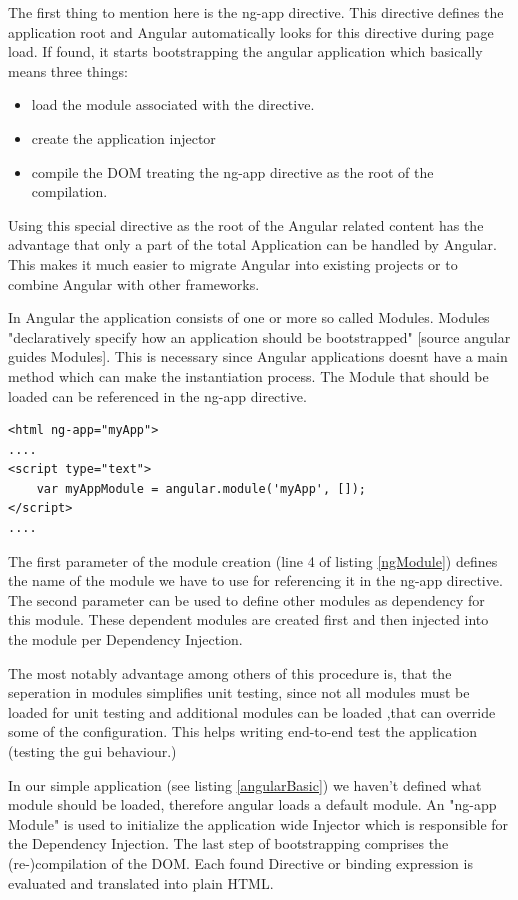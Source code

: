 The first thing to mention here is the ng-app directive. This directive defines the application root and Angular automatically looks for this directive during page load. If found, it starts bootstrapping the angular application which basically means three things:
\begin{itemize}
	\item load the module associated with the directive.
	\item create the application injector
	\item compile the DOM treating the ng-app directive as the root of the compilation. 
\end{itemize}

Using this special directive as the root of the Angular related content has the advantage that only a part of the total Application can be handled by Angular. This makes it much easier to migrate Angular into existing projects or to combine Angular with other frameworks.

In Angular the application consists of one or more so called Modules. Modules "declaratively specify how an application should be bootstrapped" [source angular guides Modules]. This is necessary since Angular applications doesnt have a main method which can make the instantiation process. The Module that should be loaded can be referenced in the ng-app directive. 
\begin{lstlisting}[label=ngModule]
<html ng-app="myApp">
....
<script type="text">
	var myAppModule = angular.module('myApp', []);
</script>
....
\end{lstlisting}

The first parameter of the module creation (line 4 of listing \ref{ngModule}) defines the name of the module we have to use for referencing it in the ng-app directive. The second parameter can be used to define other modules as dependency for this module. These dependent modules are created first and then injected into the module per Dependency Injection.


The most notably advantage among others of this procedure is, that the seperation in modules simplifies unit testing, since not all modules must be loaded for unit testing and additional modules can be loaded ,that can override some of the configuration. This helps writing end-to-end test the application (testing the gui behaviour.) 


In our simple application (see listing \ref{angularBasic}) we haven't defined what module should be loaded, therefore angular loads a default module. An "ng-app Module" is used to initialize the application wide Injector which is responsible for the Dependency Injection. The last step of bootstrapping comprises the (re-)compilation of the DOM. Each found Directive or binding expression is evaluated and translated into plain HTML.


